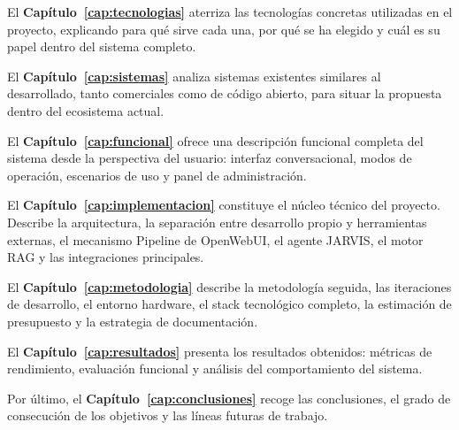 El \textbf{Capítulo~\ref{cap:tecnologias}} aterriza las tecnologías concretas utilizadas en el proyecto, explicando para qué sirve cada una, por qué se ha elegido y cuál es su papel dentro del sistema completo.

El \textbf{Capítulo~\ref{cap:sistemas}} analiza sistemas existentes similares al desarrollado, tanto comerciales como de código abierto, para situar la propuesta dentro del ecosistema actual.

El \textbf{Capítulo~\ref{cap:funcional}} ofrece una descripción funcional completa del sistema desde la perspectiva del usuario: interfaz conversacional, modos de operación, escenarios de uso y panel de administración.

El \textbf{Capítulo~\ref{cap:implementacion}} constituye el núcleo técnico del proyecto. Describe la arquitectura, la separación entre desarrollo propio y herramientas externas, el mecanismo Pipeline de OpenWebUI, el agente JARVIS, el motor RAG y las integraciones principales.

El \textbf{Capítulo~\ref{cap:metodologia}} describe la metodología seguida, las iteraciones de desarrollo, el entorno hardware, el stack tecnológico completo, la estimación de presupuesto y la estrategia de documentación.

El \textbf{Capítulo~\ref{cap:resultados}} presenta los resultados obtenidos: métricas de rendimiento, evaluación funcional y análisis del comportamiento del sistema.

Por último, el \textbf{Capítulo~\ref{cap:conclusiones}} recoge las conclusiones, el grado de consecución de los objetivos y las líneas futuras de trabajo.
